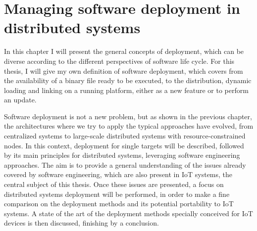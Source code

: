 \chapter{Managing software deployment in distributed systems}
\label{ch:managingDS}
In this chapter I will present the general concepts of deployment, which can be diverse according to the different perspectives of software life cycle.
For this thesis, I will give my own definition of software deployment, which covers from the availability of a binary file ready to be executed, to the distribution, dynamic loading and linking on a running platform, either as a new feature or to perform an update.

Software deployment is not a new problem, but as shown in the previous chapter, the architectures where we try to apply the typical approaches have evolved, from centralized systems to large-scale distributed systems with resource-constrained nodes.
In this context, deployment for single targets will be described, followed by its main principles for distributed systems, leveraging software engineering approaches.
The aim is to provide a general understanding of the issues already covered by software engineering, which are also present in IoT systems, the central subject of this thesis.
Once these issues are presented, a focus on distributed systems deployment will be performed, in order to make a fine comparison on the deployment methods and its potential portability to IoT systems.
A state of the art of the deployment methods specially conceived for IoT devices is then discussed, finishing by a conclusion.


